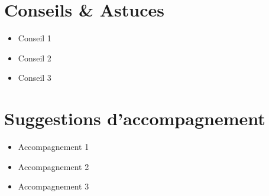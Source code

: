 \section*{Conseils \& Astuces}
\begin{itemize}
    \item Conseil 1
    \item Conseil 2
    \item Conseil 3
\end{itemize}

\section*{Suggestions d’accompagnement}
\begin{itemize}
    \item Accompagnement 1
    \item Accompagnement 2
    \item Accompagnement 3
\end{itemize}
